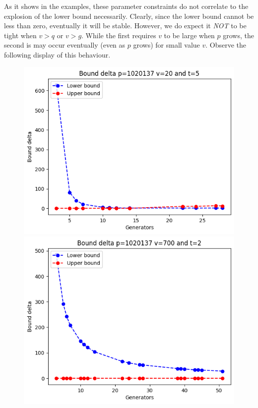 \documentclass{article}
\begin{document}
As it shows in the examples, these parameter constraints do not correlate to the explosion of the lower bound necessarily. Clearly, since the lower bound cannot be less than zero, eventually it will be stable. However, we do expect it \emph{NOT} to be tight when $v > q$ or $v > g$. While the first requires $v$ to be large when $p$ grows, the second is may occur eventually (even as $p$ grows) for small value $v$. Observe the following display of this behaviour.
\begin{figure}[H]
    \begin{minipage}{.49\textwidth}
            \centering
            \includegraphics[width=\textwidth]{../plots/tuples_figures/explosion_example_3.png}
    \end{minipage}
    \begin{minipage}{.49\textwidth}
            \centering
            \includegraphics[width=\textwidth]{../plots/tuples_figures/explosion_example_4.png}
    \end{minipage}
\end{figure}
\end{document}
